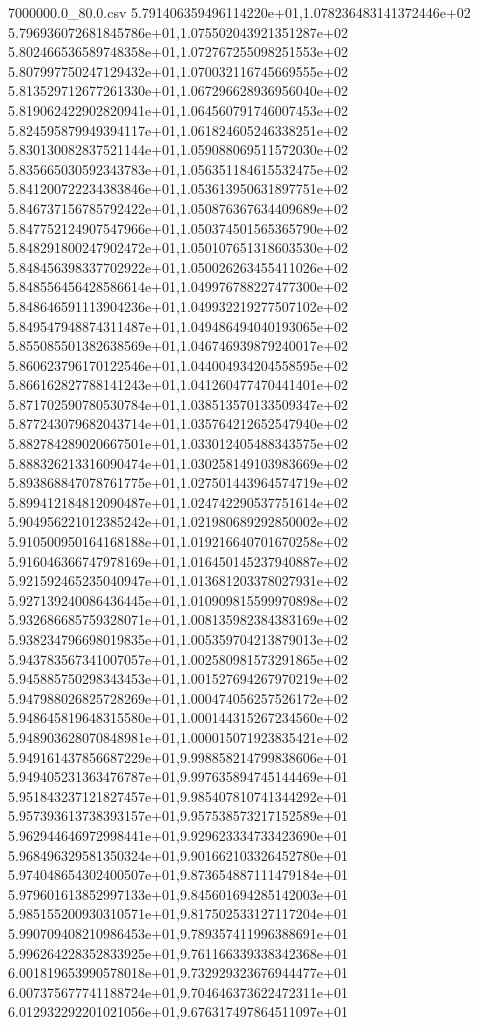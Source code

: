 \begin{filecontents*}{7000000.0_80.0.csv}
5.791406359496114220e+01,1.078236483141372446e+02
5.796936072681845786e+01,1.075502043921351287e+02
5.802466536589748358e+01,1.072767255098251553e+02
5.807997750247129432e+01,1.070032116745669555e+02
5.813529712677261330e+01,1.067296628936956040e+02
5.819062422902820941e+01,1.064560791746007453e+02
5.824595879949394117e+01,1.061824605246338251e+02
5.830130082837521144e+01,1.059088069511572030e+02
5.835665030592343783e+01,1.056351184615532475e+02
5.841200722234383846e+01,1.053613950631897751e+02
5.846737156785792422e+01,1.050876367634409689e+02
5.847752124907547966e+01,1.050374501565365790e+02
5.848291800247902472e+01,1.050107651318603530e+02
5.848456398337702922e+01,1.050026263455411026e+02
5.848556456428586614e+01,1.049976788227477300e+02
5.848646591113904236e+01,1.049932219277507102e+02
5.849547948874311487e+01,1.049486494040193065e+02
5.855085501382638569e+01,1.046746939879240017e+02
5.860623796170122546e+01,1.044004934204558595e+02
5.866162827788141243e+01,1.041260477470441401e+02
5.871702590780530784e+01,1.038513570133509347e+02
5.877243079682043714e+01,1.035764212652547940e+02
5.882784289020667501e+01,1.033012405488343575e+02
5.888326213316090474e+01,1.030258149103983669e+02
5.893868847078761775e+01,1.027501443964574719e+02
5.899412184812090487e+01,1.024742290537751614e+02
5.904956221012385242e+01,1.021980689292850002e+02
5.910500950164168188e+01,1.019216640701670258e+02
5.916046366747978169e+01,1.016450145237940887e+02
5.921592465235040947e+01,1.013681203378027931e+02
5.927139240086436445e+01,1.010909815599970898e+02
5.932686685759328071e+01,1.008135982384383169e+02
5.938234796698019835e+01,1.005359704213879013e+02
5.943783567341007057e+01,1.002580981573291865e+02
5.945885750298343453e+01,1.001527694267970219e+02
5.947988026825728269e+01,1.000474056257526172e+02
5.948645819648315580e+01,1.000144315267234560e+02
5.948903628070848981e+01,1.000015071923835421e+02
5.949161437856687229e+01,9.998858214799838606e+01
5.949405231363476787e+01,9.997635894745144469e+01
5.951843237121827457e+01,9.985407810741344292e+01
5.957393613738393157e+01,9.957538573217152589e+01
5.962944646972998441e+01,9.929623334733423690e+01
5.968496329581350324e+01,9.901662103326452780e+01
5.974048654302400507e+01,9.873654887111479184e+01
5.979601613852997133e+01,9.845601694285142003e+01
5.985155200930310571e+01,9.817502533127117204e+01
5.990709408210986453e+01,9.789357411996388691e+01
5.996264228352833925e+01,9.761166339338342368e+01
6.001819653990578018e+01,9.732929323676944477e+01
6.007375677741188724e+01,9.704646373622472311e+01
6.012932292201021056e+01,9.676317497864511097e+01

\end{filecontents*}
